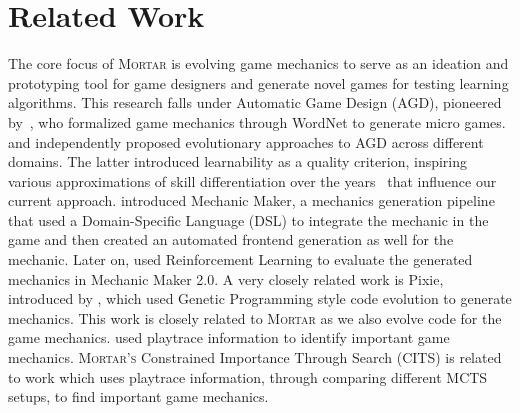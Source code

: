 \documentclass{article} %
\newcommand{\name}{\textsc{Mortar}}
\newcommand{\names}{\textsc{Mortar's}}
\begin{document}


\section{Related Work}

The core focus of \name{} is evolving game mechanics to serve as an ideation and prototyping tool for game designers and generate novel games for testing learning algorithms. This research falls under Automatic Game Design (AGD), pioneered by~\citep{nelson2007towards}, who formalized game mechanics through WordNet to generate micro games. \citet{browne2008automatic} and \citet{togelius2008experiment} independently proposed evolutionary approaches to AGD across different domains. The latter introduced learnability as a quality criterion, inspiring various approximations of skill differentiation over the years~\citep{nielsen2015general,khalifa2017general} that influence our current approach. \citet{sumner2024mechanic} introduced Mechanic Maker, a mechanics generation pipeline that used a Domain-Specific Language (DSL) to integrate the mechanic in the game and then created an automated frontend generation as well for the mechanic. Later on, \cite{gonzalez2023mechanic} used Reinforcement Learning to evaluate the generated mechanics in Mechanic Maker 2.0. A very closely related work is Pixie, introduced by \citet{cook2025pixie}, which used Genetic Programming style code evolution to generate mechanics. This work is closely related to \name{} as we also evolve code for the game mechanics.  used playtrace information to identify important game mechanics. \names{} Constrained Importance Through Search (CITS) is related to \citet{green2019automatic} work which uses playtrace information, through comparing different MCTS setups, to find important game mechanics. 
\end{document}
